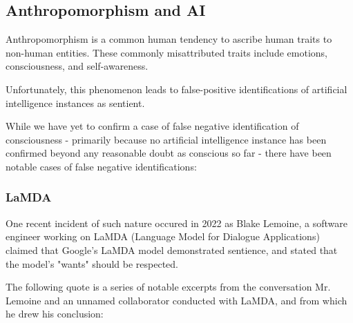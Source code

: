 \documentclass[masterthesis]{fer}
\begin{document}
\subsection{Anthropomorphism and AI}

Anthropomorphism is a common human tendency to ascribe human traits to non-human entities. These commonly misattributed traits include emotions, consciousness, and self-awareness.

Unfortunately, this phenomenon leads to false-positive identifications of artificial intelligence instances as sentient.

While we have yet to confirm a case of false negative identification of consciousness - primarily because no artificial intelligence instance has been confirmed beyond any reasonable doubt as conscious so far - there have been notable cases of false negative identifications:

\subsubsection{LaMDA}

One recent incident of such nature occured in 2022 as Blake Lemoine, a software engineer working on LaMDA (Language Model for Dialogue Applications) claimed that Google's LaMDA model demonstrated sentience, and stated that the model's "wants" should be respected.

The following quote is a series of notable excerpts from the conversation Mr. Lemoine and an unnamed collaborator conducted with LaMDA, and from which he drew his conclusion:
\end{document}
